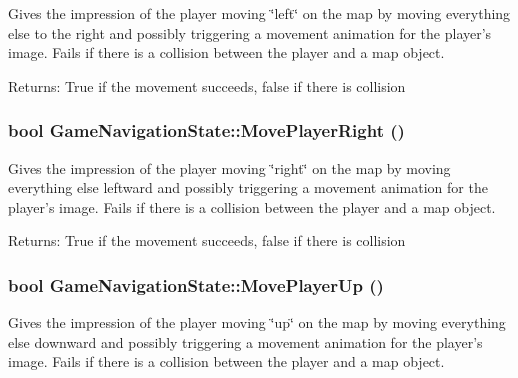 Gives the impression of the player moving \char`\"{}left\char`\"{} on the map by moving everything else to the right and possibly triggering a movement animation for the player's image. Fails if there is a collision between the player and a map object.

\begin{Desc}
\item[Returns:]True if the movement succeeds, false if there is collision \end{Desc}
\hypertarget{class_game_navigation_state_0b505a64bcf97883bb9e15d0d008174e}{
\subsubsection[{MovePlayerRight}]{\setlength{\rightskip}{0pt plus 5cm}bool GameNavigationState::MovePlayerRight ()}}
\label{de/d2a/class_game_navigation_state_0b505a64bcf97883bb9e15d0d008174e}


Gives the impression of the player moving \char`\"{}right\char`\"{} on the map by moving everything else leftward and possibly triggering a movement animation for the player's image. Fails if there is a collision between the player and a map object.

\begin{Desc}
\item[Returns:]True if the movement succeeds, false if there is collision \end{Desc}
\hypertarget{class_game_navigation_state_fd803365fe0a32b60cf9105ee45b4042}{
\subsubsection[{MovePlayerUp}]{\setlength{\rightskip}{0pt plus 5cm}bool GameNavigationState::MovePlayerUp ()}}
\label{de/d2a/class_game_navigation_state_fd803365fe0a32b60cf9105ee45b4042}


Gives the impression of the player moving \char`\"{}up\char`\"{} on the map by moving everything else downward and possibly triggering a movement animation for the player's image. Fails if there is a collision between the player and a map object.

